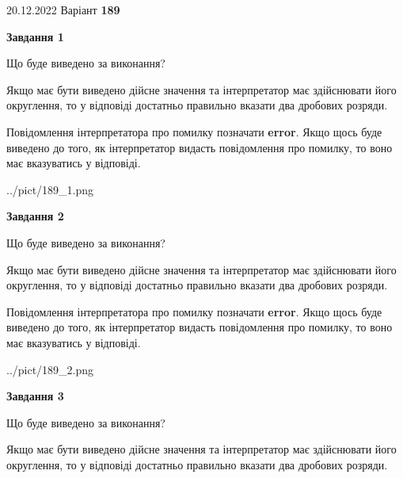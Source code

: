 \documentclass[12pt, ukrainian]{article}
\begin{document}
{20.12.2022 Варіант \No \textbf { 189 }\par}
{
\begin {Large}

{\begin {center}\textbf{Завдання 1}\end {center}}\par
Що буде виведено за виконання? \par

Якщо має бути виведено дійсне значення та інтерпретатор має здійснювати його округлення, 
то у відповіді достатньо правильно вказати два дробових розряди.

Повідомлення інтерпретатора про помилку позначати \textbf{error}.
Якщо щось буде виведено до того, як інтерпретатор видасть повідомлення про помилку, 
то воно має вказуватись у відповіді. \par

\begin{center}
	{../pict/189_1.png}
\end{center}
\newpage

{\begin {center}\textbf{Завдання 2}\end {center}}\par
Що буде виведено за виконання? \par

Якщо має бути виведено дійсне значення та інтерпретатор має здійснювати його округлення, 
то у відповіді достатньо правильно вказати два дробових розряди.

Повідомлення інтерпретатора про помилку позначати \textbf{error}.
Якщо щось буде виведено до того, як інтерпретатор видасть повідомлення про помилку, 
то воно має вказуватись у відповіді. \par

\begin{center}
	{../pict/189_2.png}
\end{center}
\newpage

{\begin {center}\textbf{Завдання 3}\end {center}}\par
Що буде виведено за виконання? \par

Якщо має бути виведено дійсне значення та інтерпретатор має здійснювати його округлення, 
то у відповіді достатньо правильно вказати два дробових розряди.


\end{Large}}
\end{document}
